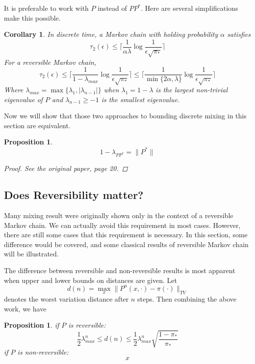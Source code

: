 \documentclass[12pt,reqno]{amsart}
\newtheorem{cor}[thm]{Corollary}
\newtheorem{prop}[thm]{Proposition}
\begin{document}
It is preferable to work with $P$ instead of $PP^*$. Here are several simplifications make this possible.

\begin{cor}
In discrete time, a Markov chain with holding probability $\alpha$ satisfies
  \begin{equation}
        \tau_2(\epsilon) \leq \lceil \frac{1}{\alpha\lambda} \log \frac{1}{\epsilon \sqrt{\pi_*}} \rceil
  \end{equation}
For a reversible Markov chain,
  \begin{equation}
      \tau_2(\epsilon) \leq \lceil \frac{1}{1-\lambda_{max}} \log \frac{1}{\epsilon \sqrt{\pi_*}} \rceil   \leq \lceil \frac{1}{\min\{2\alpha,\lambda\}} \log \frac{1}{\epsilon \sqrt{\pi_*}} \rceil 
  \end{equation}
Where $\lambda_{max} = \max\{\lambda_1,|\lambda_{n-1}|\}$ when $\lambda_1 = 1 - \lambda$ is the largest non-trivial eigenvalue of $P$ and $\lambda_{n-1}\geq -1$ is the smallest eigenvalue. 
\end{cor}

Now we will show that those two approaches to bounding discrete mixing in this section are equivalent.
\begin{prop}
  \begin{equation}
    \label{eq:two_same}
    1 - \lambda_{PP^*} = \|P^* \|
  \end{equation}
    \begin{proof}
      See the original paper, page 20.
    \end{proof}

\end{prop}


\subsection{Does Reversibility matter?}
Many mixing result were originally shown only in the context of a reversible Markov chain. We can actually avoid this requirement in most cases. However, there are still some cases that this requirement is necessary. In this section, some difference would be covered, and some classical results of reversible Markov chain will be illustrated.

The difference between reversible and non-reversible results is most apparent when upper and lower bounds on distances are given. Let
$$ d(n) = \max_x\|P^n(x,\cdot)-\pi(\cdot) \|_{TV}
$$
denotes the worst variation distance after $n$ steps. Then combining the above work, we have
\begin{prop}
  if $P$ is reversible:
  \begin{equation}
   \frac{1}{2}\lambda^n_{max} \leq d(n) \leq \frac{1}{2}\lambda^n_{max} \sqrt{\frac{1-\pi_*}{\pi_*}}     
  \end{equation}
if $P$ is non-reversible:
  \begin{equation}
    x
  \end{equation}
\end{prop}
\end{document}
